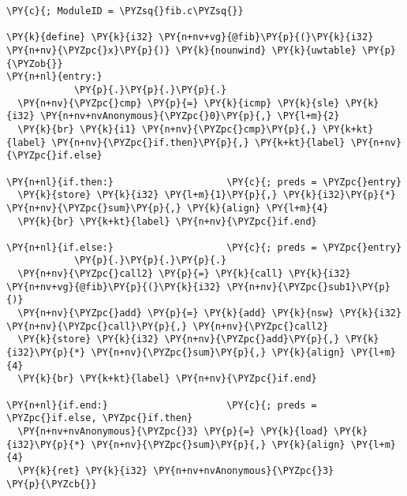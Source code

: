 \begin{Verbatim}[commandchars=\\\{\}]
\PY{c}{; ModuleID = \PYZsq{}fib.c\PYZsq{}}

\PY{k}{define} \PY{k}{i32} \PY{n+nv+vg}{@fib}\PY{p}{(}\PY{k}{i32} \PY{n+nv}{\PYZpc{}x}\PY{p}{)} \PY{k}{nounwind} \PY{k}{uwtable} \PY{p}{\PYZob{}}
\PY{n+nl}{entry:}
            \PY{p}{.}\PY{p}{.}\PY{p}{.}
  \PY{n+nv}{\PYZpc{}cmp} \PY{p}{=} \PY{k}{icmp} \PY{k}{sle} \PY{k}{i32} \PY{n+nv+nvAnonymous}{\PYZpc{}0}\PY{p}{,} \PY{l+m}{2}
  \PY{k}{br} \PY{k}{i1} \PY{n+nv}{\PYZpc{}cmp}\PY{p}{,} \PY{k+kt}{label} \PY{n+nv}{\PYZpc{}if.then}\PY{p}{,} \PY{k+kt}{label} \PY{n+nv}{\PYZpc{}if.else}

\PY{n+nl}{if.then:}                    \PY{c}{; preds = \PYZpc{}entry}
  \PY{k}{store} \PY{k}{i32} \PY{l+m}{1}\PY{p}{,} \PY{k}{i32}\PY{p}{*} \PY{n+nv}{\PYZpc{}sum}\PY{p}{,} \PY{k}{align} \PY{l+m}{4}
  \PY{k}{br} \PY{k+kt}{label} \PY{n+nv}{\PYZpc{}if.end}

\PY{n+nl}{if.else:}                    \PY{c}{; preds = \PYZpc{}entry}
            \PY{p}{.}\PY{p}{.}\PY{p}{.}
  \PY{n+nv}{\PYZpc{}call2} \PY{p}{=} \PY{k}{call} \PY{k}{i32} \PY{n+nv+vg}{@fib}\PY{p}{(}\PY{k}{i32} \PY{n+nv}{\PYZpc{}sub1}\PY{p}{)}
  \PY{n+nv}{\PYZpc{}add} \PY{p}{=} \PY{k}{add} \PY{k}{nsw} \PY{k}{i32} \PY{n+nv}{\PYZpc{}call}\PY{p}{,} \PY{n+nv}{\PYZpc{}call2}
  \PY{k}{store} \PY{k}{i32} \PY{n+nv}{\PYZpc{}add}\PY{p}{,} \PY{k}{i32}\PY{p}{*} \PY{n+nv}{\PYZpc{}sum}\PY{p}{,} \PY{k}{align} \PY{l+m}{4}
  \PY{k}{br} \PY{k+kt}{label} \PY{n+nv}{\PYZpc{}if.end}

\PY{n+nl}{if.end:}                     \PY{c}{; preds = \PYZpc{}if.else, \PYZpc{}if.then}
  \PY{n+nv+nvAnonymous}{\PYZpc{}3} \PY{p}{=} \PY{k}{load} \PY{k}{i32}\PY{p}{*} \PY{n+nv}{\PYZpc{}sum}\PY{p}{,} \PY{k}{align} \PY{l+m}{4}
  \PY{k}{ret} \PY{k}{i32} \PY{n+nv+nvAnonymous}{\PYZpc{}3}
\PY{p}{\PYZcb{}}
\end{Verbatim}
